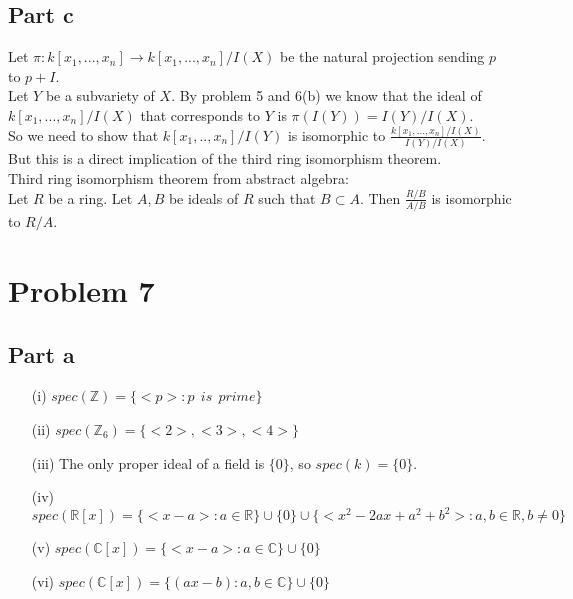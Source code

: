 \documentclass[12pt]{article}
\begin{document}
\subsection*{Part c}
Let $\pi : k[x_1,...,x_n] \rightarrow k[x_1,...,x_n]/I(X)$ be the natural projection sending $p$ to $p+I$. \\
Let $Y$ be a subvariety of $X$. By problem 5 and 6(b) we know that the ideal of $k[x_1,...,x_n]/I(X)$ that corresponds to $Y$ is $\pi(I(Y))=I(Y)/I(X)$. \\
So we need to show that $k[x_1,..,x_n]/I(Y)$ is isomorphic to $\frac{k[x_1,...,x_n]/I(X)}{I(Y)/I(X)}$. But this is a direct implication of the third ring isomorphism theorem. \\
Third ring isomorphism theorem from abstract algebra: 
\\
Let $R$ be a ring. Let $A,B$ be ideals of $R$ such that $B \subset A$. Then $\frac{R/B}{A/B}$ is isomorphic to $R/A$.

\clearpage
\section*{Problem 7}
\subsection*{Part a}
\begin{enumerate}
\item[(i)]
$spec(\mathbb{Z})=\{<p>: p \  \ is \ \ prime \}$
\item[(ii)]
$spec(\mathbb{Z}_6)=\{<2>,<3>,<4>\}$
\item[(iii)]
The only proper ideal of a field is $\{0\}$, so  $spec(k)=\{0\}$.
\item[(iv)]
$spec(\mathbb{R}[x])=\{<x-a>: a \in \mathbb{R}\} \cup \{0\} \cup \{<x^2-2ax+a^2+b^2> :a,b \in \mathbb{R}, b \not=0\}$
\item[(v)]
$spec(\mathbb{C}[x])=\{<x-a>: a \in \mathbb{C}\} \cup \{0\}$
\item[(vi)]
$spec(\mathbb{C}[x])=\{(ax-b): a,b \in \mathbb{C}\} \cup \{0\}$
\end{enumerate}
\end{document}
